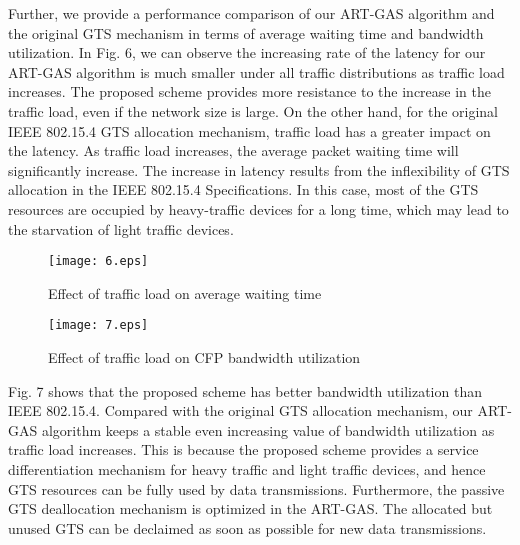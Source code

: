 \documentclass[letterpaper]{sig-alternate-10pt}
\begin{document}
Further, we provide a performance comparison of our ART-GAS algorithm and the original GTS mechanism in terms of average waiting time and bandwidth utilization. In Fig. 6, we can observe the increasing rate of the latency for our ART-GAS algorithm is much smaller under all traffic distributions as traffic load increases. The proposed scheme provides more resistance to the increase in the traffic load, even if the network size is large. On the other hand, for the original IEEE 802.15.4 GTS allocation mechanism, traffic load has a greater impact on the latency. As traffic load increases, the average packet waiting time will significantly increase. The increase in latency results from the inflexibility of GTS allocation in the IEEE 802.15.4 Specifications. In this case, most of the GTS resources are occupied by heavy-traffic devices for a long time, which may lead to the starvation of light traffic devices.

\begin{figure}[!t]
\renewcommand{\captionfont}{\bfseries}
\centering
\texttt{[image: 6.eps]}
\centering
\caption{Effect of traffic load on average waiting time}
\label{fig_sim}
\end{figure}

\begin{figure}[!t]
\renewcommand{\captionfont}{\bfseries}
\centering
\texttt{[image: 7.eps]}
\centering
\caption{Effect of traffic load on CFP bandwidth utilization}
\label{fig_sim}
\end{figure}

Fig. 7 shows that the proposed scheme has better bandwidth utilization than IEEE 802.15.4. Compared with the original GTS allocation mechanism, our ART-GAS algorithm keeps a stable even increasing value of bandwidth utilization as traffic load increases. This is because the proposed scheme provides a service differentiation mechanism for heavy traffic and light traffic devices, and hence GTS resources can be fully used by data transmissions. Furthermore, the passive GTS deallocation mechanism is optimized in the ART-GAS. The allocated but unused GTS can be declaimed as soon as possible for new data transmissions.
\end{document}

